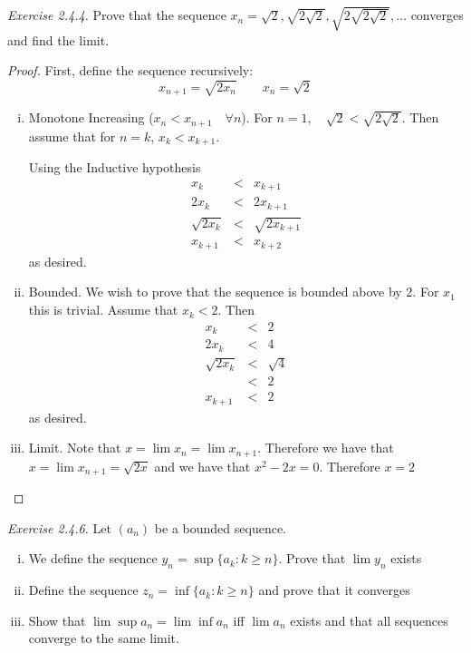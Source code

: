 \documentclass{tufte-book}
\theoremstyle{definition}
\numberwithin{section}{chapter}
\begin{document}
\emph{Exercise 2.4.4.}  Prove that the sequence $x_n = \sqrt{2}, \sqrt{2\sqrt{2}}, \sqrt{2\sqrt{2\sqrt{2}}}, \ldots$
	converges and find the limit.
	
	\begin{proof}
	First, define the sequence recursively:
	$$  x_{n+1} = \sqrt{2 x_n} \qquad x_n = \sqrt{2} $$
		\begin{enumerate}[(i)]
		
			\item Monotone Increasing  ($x_{n} < x_{n+1}\quad \forall n$).  For $n=1, \quad \sqrt{2} < \sqrt{2\sqrt{2}}$. Then assume that for $n=k$, $x_k < x_{k+1}$.
			
			Using the Inductive hypothesis
			\begin{eqnarray*}
x_{k}  & <& x_{k+1} \\
   	2x_{k}  &<& 2x_{k+1} \\
    \sqrt{2x_{k}}  &<&\sqrt{ 2 x_{k+1}}\\
    x_{k+1}  & <& x_{k+2}
\end{eqnarray*} as desired.

\item Bounded.  We wish to prove that the sequence is bounded above by 2.
For $x_1$ this is trivial.  Assume that $x_k < 2$.
Then 
\begin{eqnarray*}
x_{k}  & <& 2 \\
   	2x_{k}  &<& 4 \\
    \sqrt{2x_{k}}  &<&\sqrt{ 4}\\
 & <& 2 \\
 x_{k+1}  & <& 2
\end{eqnarray*} as desired.   


\item Limit.  Note that $x = \lim x_n = \lim x_{n+1}$.  Therefore we have that $x = \lim x_{n+1} = \sqrt{2x}$ and we have that $x^2 - 2x = 0$.  Therefore $x = 2$
		\end{enumerate}
	\end{proof}
	
	\emph{Exercise 2.4.6.} Let $(a_n)$ be a bounded sequence.
	
	\begin{enumerate}[(i)]
	\item We define the sequence $y_n = \sup \{a_k : k \geq n\}$.  Prove that $\lim y_n$ exists
	\item Define the sequence $z_n = \inf \{a_k : k \geq n\}$ and prove that it converges
	\item Show that $\lim \sup a_n = \lim \inf a_n$ iff $\lim a_n$ exists and that all sequences converge to the same limit.
	\end{enumerate} %
\end{document}
